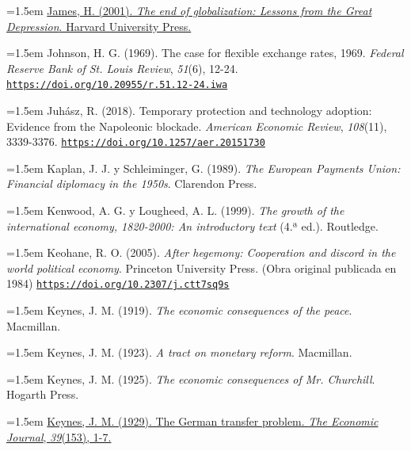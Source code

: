 \documentclass[10pt,a4paper]{article}
\begin{document}
{\sloppy\noindent\hangindent=1.5em \href{https://history.princeton.edu/about/publications/end-globalization-lessons-great-depression}{James, H. (2001). \textit{The end of globalization: Lessons from the Great Depression}. Harvard University Press.}\par}

{\sloppy\noindent\hangindent=1.5em Johnson, H. G. (1969). The case for flexible exchange rates, 1969. \textit{Federal Reserve Bank of St. Louis Review}, \textit{51}(6), 12-24. \href{https://doi.org/10.20955/r.51.12-24.iwa}{\nolinkurl{https://doi.org/10.20955/r.51.12-24.iwa}}\par}

{\sloppy\noindent\hangindent=1.5em Juhász, R. (2018). Temporary protection and technology adoption: Evidence from the Napoleonic blockade. \textit{American Economic Review}, \textit{108}(11), 3339-3376. \href{https://doi.org/10.1257/aer.20151730}{\nolinkurl{https://doi.org/10.1257/aer.20151730}}\par}

{\sloppy\noindent\hangindent=1.5em Kaplan, J. J. y Schleiminger, G. (1989). \textit{The European Payments Union: Financial diplomacy in the 1950s}. Clarendon Press.\par}

\noindent\hangindent=1.5em Kenwood, A. G. y Lougheed, A. L. (1999). \textit{The growth of the international economy, 1820-2000: An introductory text} (4.ª ed.). Routledge.

{\sloppy\noindent\hangindent=1.5em Keohane, R. O. (2005). \textit{After hegemony: Cooperation and discord in the world political economy}. Princeton University Press. (Obra original publicada en 1984) \href{https://doi.org/10.2307/j.ctt7sq9s}{\nolinkurl{https://doi.org/10.2307/j.ctt7sq9s}}\par}

\noindent\hangindent=1.5em Keynes, J. M. (1919). \textit{The economic consequences of the peace}. Macmillan.

\noindent\hangindent=1.5em Keynes, J. M. (1923). \textit{A tract on monetary reform}. Macmillan.

{\sloppy\noindent\hangindent=1.5em Keynes, J. M. (1925). \textit{The economic consequences of Mr. Churchill}. Hogarth Press.\par}

{\sloppy\noindent\hangindent=1.5em \href{https://academic.oup.com/ej/issue/39/153}{Keynes, J. M. (1929). The German transfer problem. \textit{The Economic Journal}, \textit{39}(153), 1-7.}\par}
\end{document}
